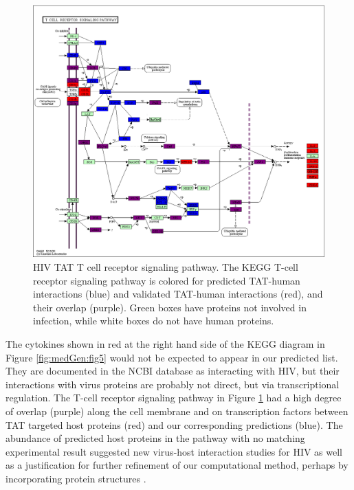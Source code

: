 \begin{figure}
\begin{center}
\includegraphics[scale=0.25]{figs/medGen_6}
\end{center}
\caption[HIV TAT T-cell receptor signaling pathway]{\small HIV TAT T
  cell receptor signaling pathway. The KEGG T-cell receptor signaling
  pathway is colored for predicted TAT-human interactions (blue) and
  validated TAT-human interactions (red), and their overlap
  (purple). Green boxes have proteins not involved in infection, while
  white boxes do not have human proteins. \label{fig:medGen:fig6}}
\end{figure}

The cytokines shown in red at the right hand side of the KEGG diagram
in Figure \ref{fig:medGen:fig5} would not be expected to appear in our
predicted list. They are documented in the NCBI database as interacting
with HIV, but their interactions with virus proteins are probably not
direct, but via transcriptional regulation. The T-cell receptor
signaling pathway in Figure \ref{fig:medGen:fig6} had a high degree of
overlap (purple) along the cell membrane and on transcription factors
between TAT targeted host proteins (red) and our corresponding
predictions (blue). The abundance of predicted host proteins in the
pathway with no matching experimental result suggested new virus-host
interaction studies for HIV as well as a justification for further
refinement of our computational method, perhaps by incorporating
protein structures \cite{doolittle2010structural}.

